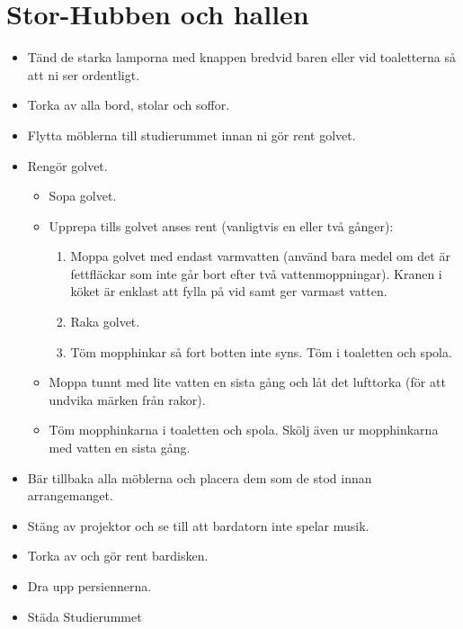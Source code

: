 \section{Stor-Hubben och hallen}
\begin{itemize}
    \item Tänd de starka lamporna med knappen bredvid baren eller vid toaletterna så att ni ser ordentligt.
    \item Torka av alla bord, stolar och soffor.
    \item Flytta möblerna till studierummet innan ni gör rent golvet.
    \item Rengör golvet.
    \begin{itemize}
        \item Sopa golvet.
        \item Upprepa tills golvet anses rent (vanligtvis en eller två gånger):
        \begin{enumerate}
            \item Moppa golvet med endast varmvatten (använd bara medel om det är fettfläckar som inte går bort efter två vattenmoppningar). Kranen i köket är enklast att fylla på vid samt ger varmast vatten.
            \item Raka golvet.
            \item Töm mopphinkar så fort botten inte syns. Töm i toaletten och spola.
        \end{enumerate}
        \item Moppa tunnt med lite vatten en sista gång och låt det lufttorka (för att undvika märken från rakor).
        \item Töm mopphinkarna i toaletten och spola. Skölj även ur mopphinkarna med vatten en sista gång.
    \end{itemize}
    \item Bär tillbaka alla möblerna och placera dem som de stod innan arrangemanget.
    \item Stäng av projektor och se till att bardatorn inte spelar musik.
    \item Torka av och gör rent bardisken.
    \item Dra upp persiennerna.
    \item Städa Studierummet
\end{itemize}

